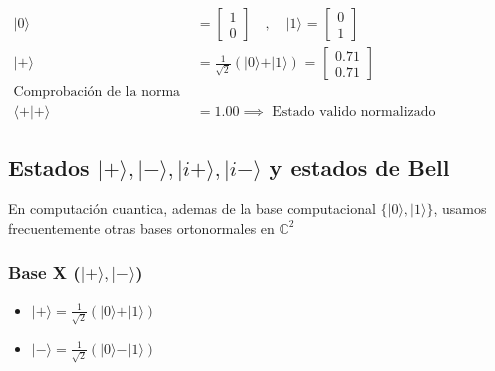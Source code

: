 \documentclass[11pt]{article}
\providecommand{\tightlist}{%
      \setlength{\itemsep}{0pt}\setlength{\parskip}{0pt}}
\begin{document}
    $\displaystyle 
\begin{aligned}
\vert{0}\rangle &= \begin{bmatrix} 1 \\ 0 \end{bmatrix} \quad , \quad \vert{1}\rangle \text{ = } \begin{bmatrix} 0 \\ 1 \end{bmatrix} \\
\vert{+}\rangle &= \frac{1}{\sqrt{2}}(\vert{0}\rangle + \vert{1}\rangle) \text{ = } \begin{bmatrix} 0.71 \\ 0.71 \end{bmatrix} \\
\text{Comprobación de la norma } \\
\langle +\vert{+}\rangle &= 1.00 \implies \text{ Estado valido normalizado }
\end{aligned}
$

    
    \subsection{\texorpdfstring{Estados
\(\vert{+}\rangle, \vert-\rangle, \vert{}i+\rangle, \vert{}i-\rangle\) y
estados de
Bell}{Estados \textbackslash vert\{+\}\textbackslash rangle, \textbackslash vert-\textbackslash rangle, \textbackslash vert\{\}i+\textbackslash rangle, \textbackslash vert\{\}i-\textbackslash rangle y estados de Bell}}\label{estados-vertrangle-vert-rangle-vertirangle-verti-rangle-y-estados-de-bell}

En computación cuantica, ademas de la base computacional
\(\{\vert{}0\rangle, \vert{}1\rangle\}\), usamos frecuentemente otras
bases ortonormales en \(\mathbb{C}^2\)

\subsubsection{\texorpdfstring{\textbf{Base X
(\(\vert{+}\rangle,\vert{-}\rangle\))}}{Base X (\textbackslash vert\{+\}\textbackslash rangle,\textbackslash vert\{-\}\textbackslash rangle)}}\label{base-x-vertranglevert-rangle}

\begin{itemize}
\tightlist
\item
  \(\vert{+}\rangle = \frac{1}{\sqrt{2}}(\vert{0}\rangle + \vert{1}\rangle)\)
\item
  \(\vert{-}\rangle = \frac{1}{\sqrt{2}}(\vert{0}\rangle - \vert{1}\rangle)\)
\end{itemize}
\end{document}
